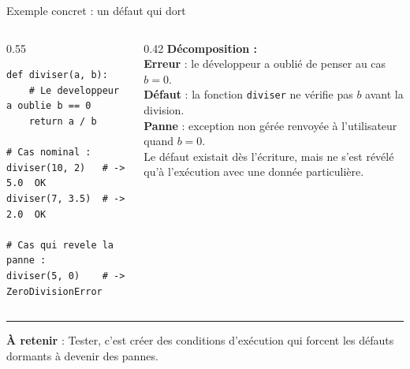 \documentclass[aspectratio=169,11pt]{beamer}
\newcommand{\takeaway}[1]{%
\vfill\begin{beamercolorbox}[wd=\linewidth,sep=0.4em]{}
\color{accent2}\rule[0.6ex]{1.2em}{1.2pt}\hspace{0.4em}%
\textbf{\color{accent2}\small À retenir} \textcolor{textsoft}{:} %
{\small\color{textmain}#1}
\end{beamercolorbox}}
\begin{document}
\begin{frame}[fragile,t]{Exemple concret : un défaut qui dort}
\begin{columns}[T,onlytextwidth]
\begin{column}{0.55\textwidth}
\vspace{0.1cm}
\begin{lstlisting}[style=pythondark]
def diviser(a, b):
    # Le developpeur a oublie b == 0
    return a / b

# Cas nominal :
diviser(10, 2)   # -> 5.0  OK
diviser(7, 3.5)  # -> 2.0  OK

# Cas qui revele la panne :
diviser(5, 0)    # -> ZeroDivisionError
\end{lstlisting}
\end{column}
\begin{column}{0.42\textwidth}
\vspace{0.1cm}\footnotesize
\textbf{Décomposition :}\\[0.3em]
\textcolor{accent}{\textbf{Erreur}} : le développeur a oublié de penser au cas $b = 0$.\\[0.3em]
\textcolor{warn}{\textbf{Défaut}} : la fonction \texttt{diviser} ne vérifie pas $b$ avant la division.\\[0.3em]
\textcolor{bad}{\textbf{Panne}} : exception non gérée renvoyée à l'utilisateur quand $b = 0$.\\[0.3em]
\textcolor{textsoft}{Le défaut existait dès l'écriture, mais ne s'est révélé qu'à l'exécution avec une donnée particulière.}
\end{column}
\end{columns}
\takeaway{Tester, c'est créer des conditions d'exécution qui forcent les défauts dormants à devenir des pannes.}
\end{frame}
\end{document}
